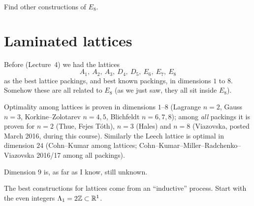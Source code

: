 \begin{exercise}
Find other constructions of $E_8$. 
\end{exercise}

\section{Laminated lattices}
\label{L04b:sec:laminated}

Before (Lecture~4) we had the lattices
\[
  A_1,\ A_2,\ A_3,\ D_4,\ D_5,\ E_6,\ E_7,\ E_8
\]
as the best lattice packings, and best known packings, in dimensions $1$ to $8$. Somehow these
are all related to $E_8$ (as we just saw, they all sit inside $E_8$).

\begin{addedblock}
Optimality among lattices is proven in dimensions $1$--$8$ (Lagrange $n=2$, Gauss $n=3$,
Korkine--Zolotarev $n=4,5$, Blichfeldt $n=6,7,8$); among \emph{all} packings it is proven for
$n=2$ (Thue, Fejes T\'oth), $n=3$ (Hales) and $n=8$ (Viazovska, posted March 2016, during this course).
Similarly the Leech lattice is optimal in dimension $24$ (Cohn--Kumar among lattices;
Cohn--Kumar--Miller--Radchenko--Viazovska 2016/17 among all packings).
\end{addedblock}

Dimension $9$ is, as far as I know, still unknown.

The best constructions for lattices come from an ``inductive'' process. Start with the even
integers $\Lambda_1 = 2\mathbb{Z}\subset\mathbb{R}^1$.

